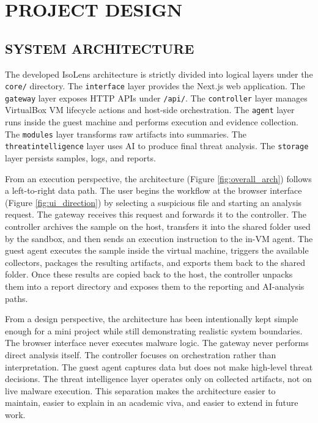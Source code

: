 \documentclass[a4paper,12pt,oneside]{report}
\begin{document}
\chapter{PROJECT DESIGN}
\section{SYSTEM ARCHITECTURE}
The developed IsoLens architecture is strictly divided into logical layers under the \texttt{core/} directory. The \texttt{interface} layer provides the Next.js web application. The \texttt{gateway} layer exposes HTTP APIs under \texttt{/api/}. The \texttt{controller} layer manages VirtualBox VM lifecycle actions and host-side orchestration. The \texttt{agent} layer runs inside the guest machine and performs execution and evidence collection. The \texttt{modules} layer transforms raw artifacts into summaries. The \texttt{threatintelligence} layer uses AI to produce final threat analysis. The \texttt{storage} layer persists samples, logs, and reports.

\par

\par

From an execution perspective, the architecture (Figure \ref{fig:overall_arch}) follows a left-to-right data path. The user begins the workflow at the browser interface (Figure \ref{fig:ui_direction}) by selecting a suspicious file and starting an analysis request. The gateway receives this request and forwards it to the controller. The controller archives the sample on the host, transfers it into the shared folder used by the sandbox, and then sends an execution instruction to the in-VM agent. The guest agent executes the sample inside the virtual machine, triggers the available collectors, packages the resulting artifacts, and exports them back to the shared folder. Once these results are copied back to the host, the controller unpacks them into a report directory and exposes them to the reporting and AI-analysis paths.

\par

\par

From a design perspective, the architecture has been intentionally kept simple enough for a mini project while still demonstrating realistic system boundaries. The browser interface never executes malware logic. The gateway never performs direct analysis itself. The controller focuses on orchestration rather than interpretation. The guest agent captures data but does not make high-level threat decisions. The threat intelligence layer operates only on collected artifacts, not on live malware execution. This separation makes the architecture easier to maintain, easier to explain in an academic viva, and easier to extend in future work.
\end{document}

